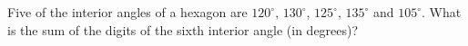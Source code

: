 Five of the interior angles of a hexagon are $120^\circ$, $130^\circ$, $125^\circ$, $135^\circ$ and $105^\circ$. What is the sum of the digits of the sixth interior angle (in degrees)?

